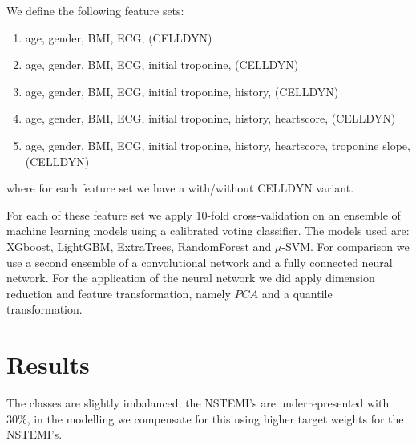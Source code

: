 \documentclass[a4paper,10pt]{article}
\begin{document}
We define the following feature sets:
\begin{enumerate}
 \item age, gender, BMI, ECG, (CELLDYN)
 \item age, gender, BMI, ECG, initial troponine, (CELLDYN)
 \item age, gender, BMI, ECG, initial troponine, history, (CELLDYN)
 \item age, gender, BMI, ECG, initial troponine, history, heartscore, (CELLDYN)
 \item age, gender, BMI, ECG, initial troponine, history, heartscore, troponine slope, (CELLDYN)
\end{enumerate}
% 
where for each feature set we have a with/without CELLDYN variant. 

For each of these feature set we apply 10-fold cross-validation on an ensemble of machine learning models using a calibrated voting classifier. The models used are: XGboost, LightGBM, ExtraTrees, RandomForest and $\mu$-SVM. 
For comparison we use a second ensemble of a convolutional network and a fully connected neural network.
For the application of the neural network we did apply dimension reduction and feature transformation, namely 
$PCA$ and a quantile transformation.



%
\section{Results}
%
The classes are slightly imbalanced; the NSTEMI's are underrepresented with $30\%$, in the modelling we compensate for this using higher target weights for the NSTEMI's. 
\end{document}
